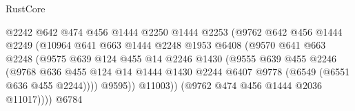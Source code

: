 \begin{lexlean}{RustCore}
\begin{coremodule}
                                        @2242
                                        @642
                                        @474
                                        @456
                                        @1444
                                        @2250
                                        @1444
                                        @2253
                                        (@9762
                                          @642
                                          @456
                                          @1444
                                          @2249
                                          (@10964
                                            @641
                                            @663
                                            @1444
                                            @2248
                                            @1953
                                            @6408
                                            (@9570
                                              @641
                                              @663
                                              @2248
                                              (@9575
                                                @639
                                                @124
                                                @455
                                                @14
                                                @2246
                                                @1430
                                                (@9555
                                                  @639
                                                  @455
                                                  @2246
                                                  (@9768
                                                    @636
                                                    @455
                                                    @124
                                                    @14
                                                    @1444
                                                    @1430
                                                    @2244
                                                    @6407
                                                    @9778
                                                    (@6549 (@6551 @636 @455 @2244))))
                                                @9595))
                                            @11003))
                                        (@9762 @474 @456 @1444 @2036 @11017))))
                                  @6784

\end{coremodule}
\end{lexlean}
